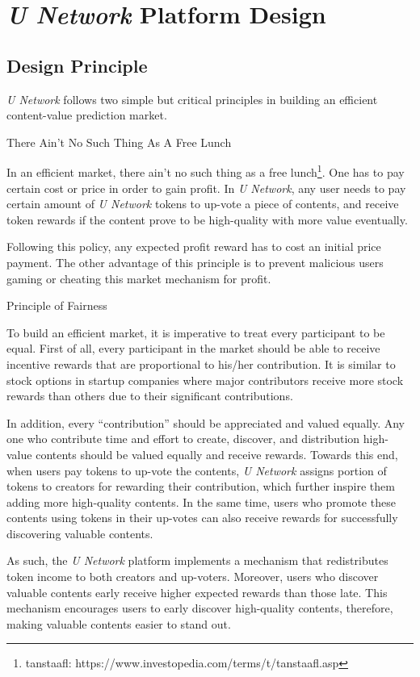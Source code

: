 \chapter{\emph{U Network} Platform Design}
\section{Design Principle}
\emph{U Network} follows two simple but critical principles in building an efficient content-value prediction market.
\begin{theorem}
There Ain't No Such Thing As A Free Lunch
\end{theorem}
In an efficient market, there ain't no such thing as a free lunch\footnote{tanstaafl: https://www.investopedia.com/terms/t/tanstaafl.asp}. One has to pay certain cost or price in order to gain profit. In \emph{U Network}, any user needs to pay certain amount of \emph{U Network} tokens to up-vote a piece of contents, and receive token rewards if the content prove to be high-quality with more value eventually. 

Following this policy, any expected profit reward has to cost an initial price payment. The other advantage of this principle is to prevent malicious users gaming or cheating this market mechanism for profit.

\begin{theorem}
 Principle of Fairness
\end{theorem}
To build an efficient market, it is imperative to treat every participant to be equal. First of all, every participant in the market should be able to receive incentive rewards that are proportional to his/her contribution. It is similar to stock options in startup companies where major contributors receive more stock rewards than others due to their significant contributions. 

In addition, every ``contribution'' should be appreciated and valued equally. Any one who contribute time and effort to create, discover, and distribution high-value contents should be valued equally and receive rewards. Towards this end, when users pay tokens to up-vote the contents, \emph{U Network} assigns portion of tokens to creators for rewarding their contribution, which further inspire them adding more high-quality contents. In the same time, users who promote these contents using tokens in their up-votes can also receive rewards for successfully discovering valuable contents. 

As such, the \emph{U Network} platform implements a mechanism that redistributes token income to both creators and up-voters.  Moreover, users who discover valuable contents early receive higher expected rewards than those late. This mechanism encourages users to early discover high-quality contents, therefore, making valuable contents easier to stand out. 

